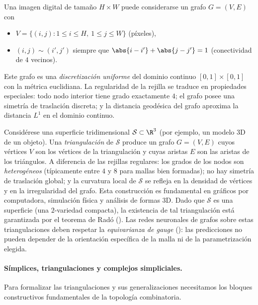 \begin{example}
\label{ex:graphs:image-grid}
Una imagen digital de tama\~no $H \times W$ puede considerarse un grafo
$G = (V, E)$ con
\begin{itemize}
  \item $V = \{(i,j) : 1 \le i \le H, \ 1 \le j \le W\}$ (p\'ixeles),
  \item $(i,j) \sim (i',j')$ siempre que $\abs{i-i'} + \abs{j-j'} = 1$
        (conectividad de $4$ vecinos).
\end{itemize}
Este grafo es una \emph{discretizaci\'on uniforme} del dominio continuo
$[0,1]\times[0,1]$ con la m\'etrica euclidiana. La regularidad de la rejilla se
traduce en propiedades especiales: todo nodo interior tiene grado exactamente
$4$; el grafo posee una simetr\'ia de traslaci\'on discreta; y la distancia
geod\'esica del grafo aproxima la distancia $L^1$ en el dominio continuo.
\end{example}

\begin{example}
\label{ex:graphs:triangulated}
Consid\'erese una superficie tridimensional $\mathcal{S} \subset \R^3$ (por
ejemplo, un modelo 3D de un objeto). Una \emph{triangulaci\'on} de $\mathcal{S}$
produce un grafo $G = (V, E)$ cuyos v\'ertices $V$ son los v\'ertices de la
triangulaci\'on y cuyas aristas $E$ son las aristas de los tri\'angulos. A
diferencia de las rejillas regulares: los grados de los nodos son
\emph{heterog\'eneos} (t\'ipicamente entre $4$ y $8$ para mallas bien formadas);
no hay simetr\'ia de traslaci\'on global; y la curvatura local de $\mathcal{S}$
se refleja en la densidad de v\'ertices y en la irregularidad del grafo. Esta
construcci\'on es fundamental en gr\'aficos por computadora, simulaci\'on f\'isica
y an\'alisis de formas 3D. Dado que $\mathcal{S}$ es una superficie (una
$2$-variedad compacta), la existencia de tal triangulaci\'on est\'a garantizada
por el teorema de Rad\'o (). Las redes neuronales de grafos
sobre estas triangulaciones deben respetar la \emph{equivarianza de gauge}
(): las predicciones no pueden depender de la orientaci\'on
espec\'ifica de la malla ni de la parametrizaci\'on elegida.
\end{example}

\paragraph{S\'implices, triangulaciones y complejos simpliciales.}
Para formalizar las triangulaciones y sus generalizaciones necesitamos los
bloques constructivos fundamentales de la topolog\'ia combinatoria.

